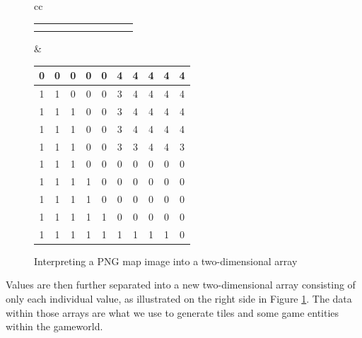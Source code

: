 \begin{figure}[H]
\begin{tabular}{cc}
{\begin{tabular}{|c|c|c|c|c|c|c|c|c|c|}
                \cellcolor{black} & \cellcolor{black} & \cellcolor{black} &
                \cellcolor{black} \\ \hline
                \cellcolor{green} & \cellcolor{green} & \cellcolor{green} &
                \cellcolor{green} & \cellcolor{green} & \cellcolor{black} &
                \cellcolor{black} & \cellcolor{black} & \cellcolor{black} &
                \cellcolor{black} \\ \hline
                \cellcolor{green} & \cellcolor{green} & \cellcolor{green} &
                \cellcolor{green} & \cellcolor{green} & \cellcolor{green} &
                \cellcolor{green} & \cellcolor{green} & \cellcolor{green} &
                \cellcolor{black} \\ \hline
            \end{tabular}
        }
        &
        {\footnotesize
            \setlength{\tabcolsep}{2.5pt}
            \begin{tabular}{|c|c|c|c|c|c|c|c|c|c|}
                \hline
                0 & 0 & 0 & 0 & 0 & 4 & 4 & 4 & 4 & 4 \\ \hline
                1 & 1 & 0 & 0 & 0 & 3 & 4 & 4 & 4 & 4 \\ \hline
                1 & 1 & 1 & 0 & 0 & 3 & 4 & 4 & 4 & 4 \\ \hline
                1 & 1 & 1 & 0 & 0 & 3 & 4 & 4 & 4 & 4 \\ \hline
                1 & 1 & 1 & 0 & 0 & 3 & 3 & 4 & 4 & 3 \\ \hline
                1 & 1 & 1 & 0 & 0 & 0 & 0 & 0 & 0 & 0 \\ \hline
                1 & 1 & 1 & 1 & 0 & 0 & 0 & 0 & 0 & 0 \\ \hline
                1 & 1 & 1 & 1 & 0 & 0 & 0 & 0 & 0 & 0 \\ \hline
                1 & 1 & 1 & 1 & 1 & 0 & 0 & 0 & 0 & 0 \\ \hline
                1 & 1 & 1 & 1 & 1 & 1 & 1 & 1 & 1 & 0 \\ \hline
            \end{tabular}
        }
    \end{tabular}
    \caption{Interpreting a PNG map image into a two-dimensional array}\label{fig:png_to_array} 
\end{figure}
Values are then further separated into a new two-dimensional array consisting of only each individual value, as illustrated on the right side in Figure \ref{fig:png_to_array}.  
The data within those arrays are what we use to generate tiles and some game entities within the gameworld.


